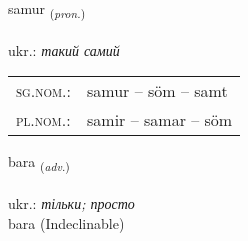 \documentclass[frontgrid, backgrid]{flacards}\usepackage[]{graphicx}\usepackage[]{xcolor}
\begin{document}
\renewcommand{\flhead}{\vskip5pt \fboxsep=0pt {\small\bfseries\footnotesize Fornafn | дієслово}}
\renewcommand{\fcfoot}{\vskip5pt \fboxsep=0pt \hspace{2pt}{\small\bfseries\footnotesize 1K}}

\renewcommand{\blhead}{\vskip5pt {\small\bfseries\footnotesize Fornafn | дієслово }}
\renewcommand{\bcfoot}{\vskip5pt \hspace{2pt}{\small\bfseries\footnotesize 1K}}


{samur \small{\textsubscript{(\textit{pron.})}} \\[1ex] %
\textphonetic{[saːmʏr]} \\
ukr.: \emph{такий самий} \\  [2ex]
\renewcommand*{\arraystretch}{0.8}
\begin{tabular}{ll}
\textsc{sg.nom.}: & samur  --  söm -- samt \\ 
\textsc{pl.nom.}: & samir -- samar -- söm
\end{tabular}
}


\renewcommand{\flhead}{\vskip5pt \fboxsep=0pt {\small\bfseries\footnotesize Atviksorð | прислівник}}
\renewcommand{\fcfoot}{\vskip5pt \fboxsep=0pt \hspace{2pt}{\small\bfseries\footnotesize 1K}}

\renewcommand{\blhead}{\vskip5pt {\small\bfseries\footnotesize Atviksorð | прислівник }}
\renewcommand{\bcfoot}{\vskip5pt \hspace{2pt}{\small\bfseries\footnotesize 1K}}


{bara \small{\textsubscript{(\textit{adv.})}} \\[1ex]
\textphonetic{[paːra]} \\
ukr.: \emph{тільки; просто} \\  [2ex]
bara (Indeclinable)}

\renewcommand{\flhead}{\vskip5pt \fboxsep=0pt {\small\bfseries\footnotesize Lýsingarorð | прикметник}}
\renewcommand{\fcfoot}{\vskip5pt \fboxsep=0pt \hspace{2pt}{\small\bfseries\footnotesize 1K}}
\end{document}
